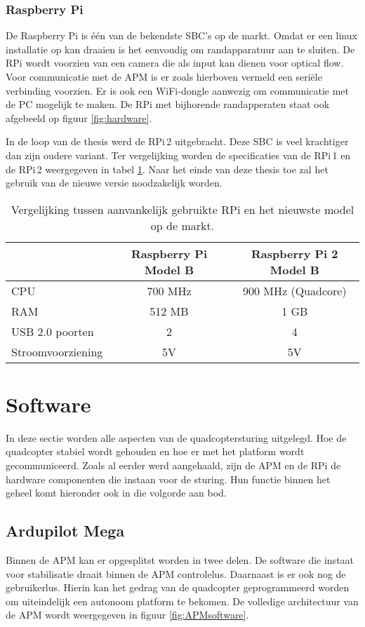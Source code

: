 \subsubsection{Raspberry Pi}
De Raspberry Pi is \'e\'en van de bekendste SBC's op de markt. Omdat er een linux installatie op kan draaien is het eenvoudig om randapparatuur aan te sluiten. De RPi wordt voorzien van een camera die als input kan dienen voor optical flow. Voor communicatie met de APM is er zoals hierboven vermeld een seri\"ele verbinding voorzien. Er is ook een WiFi-dongle aanwezig om communicatie met de PC mogelijk te maken. De RPi met bijhorende randapperaten staat ook afgebeeld op figuur \ref{fig:hardware}.

\npar In de loop van de thesis werd de RPi\,2 uitgebracht. Deze SBC is veel krachtiger dan zijn oudere variant. Ter vergelijking worden de specificaties van de RPi\,1 en de RPi\,2 weergegeven in tabel \ref{table:RP1vsRPI2}. Naar het einde van deze thesis toe zal het gebruik van de nieuwe versie noodzakelijk worden.

\begin{table}[h]
	\caption{Vergelijking tussen aanvankelijk gebruikte RPi en het nieuwste model op de markt.} \label{table:RP1vsRPI2}
	\centering
	\begin{tabular}{lcc}
		\cr
		\hline
		& Raspberry Pi Model B & Raspberry Pi 2 Model B \\
		\hline
		CPU & 700 MHz & 900 MHz (Quadcore) \\
		RAM & 512 MB & 1 GB \\
		USB 2.0 poorten & 2 & 4 \\
		Stroomvoorziening & 5V & 5V \\
		\hline
	\end{tabular}
\end{table}

\section{Software}
In deze sectie worden alle aspecten van de quadcoptersturing uitgelegd. Hoe de quadcopter stabiel wordt gehouden en hoe er met het platform wordt gecommuniceerd. Zoals al eerder werd aangehaald, zijn de APM en de RPi de hardware componenten die instaan voor de sturing. Hun functie binnen het geheel komt hieronder ook in die volgorde aan bod.

\subsection{Ardupilot Mega} \label{sec:softAPM}
Binnen de APM kan er opgesplitst worden in twee delen. De software die instaat voor stabilisatie draait binnen de APM controlelus. Daarnaast is er ook nog de gebruikerlus. Hierin kan het gedrag van de quadcopter geprogrammeerd worden om uiteindelijk een autonoom platform te bekomen. De volledige architectuur van de APM wordt weergegeven in figuur \ref{fig:APMsoftware}.

